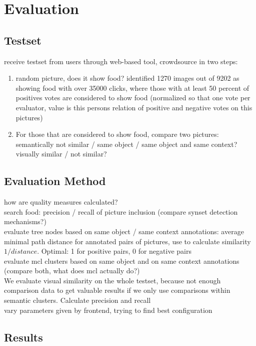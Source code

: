 %
\section{Evaluation}
\label{sec_literatur}

\subsection{Testset}
receive testset from users through web-based tool, crowdsource in two steps: \\

\begin{enumerate}
\item random picture, does it show food? identified 1270 images out of 9202 as showing food with over 35000 clicks, where those with at least 50 percent of positives votes are considered to show food (normalized so that one vote per evaluator, value is this persons relation of positive and negative votes on this pictures) \\
\item For those that are considered to show food, compare two pictures: semantically not similar / same object / same object and same context? visually similar / not similar?\\
\end{enumerate}

\subsection{Evaluation Method}
how are quality measures calculated? \\

search food: precision  / recall of picture inclusion (compare synset detection mechanisms?) \\
evaluate tree nodes based on same object / same context annotations: average minimal path distance for annotated pairs of pictures, use to calculate similarity $1/distance$. Optimal: 1 for positive pairs, 0 for negative pairs\\
evaluate mcl clusters based on same object and on same context annotations (compare both, what does mcl actually do?) \\

We evaluate visual similarity on the whole testset, because not enough comparison data to get valuable results if we only use comparisons within semantic clusters. Calculate precision and recall\\

vary parameters given by frontend, trying to find best configuration \\

\subsection{Results}

